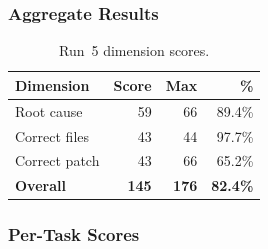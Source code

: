 \subsubsection{Aggregate Results}

\begin{table}[h]
\centering
\caption{Run~5 dimension scores.}\label{tab:r5-dim}
\begin{tabular}{lrrr}
\toprule
\textbf{Dimension} & \textbf{Score} & \textbf{Max} & \textbf{\%} \\
\midrule
Root cause         & 59 & 66 & 89.4\% \\
Correct files      & 43 & 44 & 97.7\% \\
Correct patch      & 43 & 66 & 65.2\% \\
\midrule
\textbf{Overall}   & \textbf{145} & \textbf{176} & \textbf{82.4\%} \\
\bottomrule
\end{tabular}
\end{table}

\subsubsection{Per-Task Scores}

